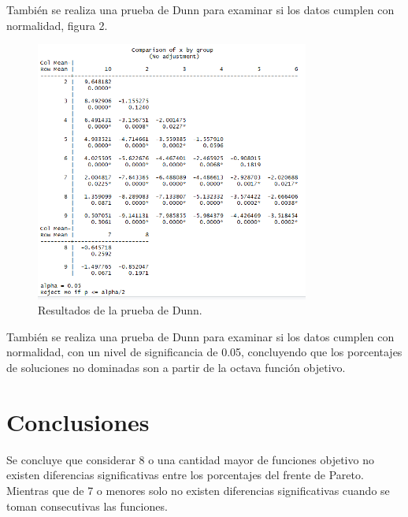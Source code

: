 \documentclass{article}
\begin{document}
También se realiza una prueba de Dunn para examinar si los datos cumplen con normalidad, figura 2.
\begin{figure}[H]
\centering
\includegraphics[width=9cm]{1.png}
\caption{Resultados de la prueba de Dunn.}
\end{figure}
También se realiza una prueba de Dunn para examinar si los datos cumplen con normalidad, con un nivel de significancia de 0.05, concluyendo que los porcentajes de soluciones no dominadas son a partir de la octava función objetivo.
\section{Conclusiones}
Se concluye que considerar 8 o una cantidad mayor de funciones objetivo no existen diferencias significativas entre los porcentajes del frente de Pareto. Mientras que de 7 o menores solo no existen diferencias significativas cuando se toman consecutivas las funciones.


\end{document}
